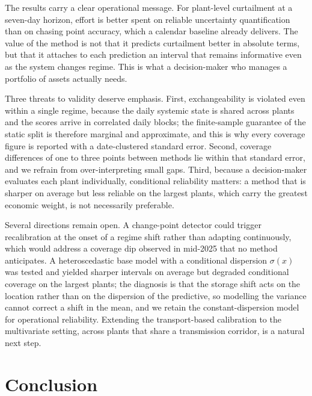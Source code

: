 \documentclass[preprint,3p,times]{elsarticle}
\begin{document}
The results carry a clear operational message. For plant-level curtailment at a seven-day horizon, effort is better spent on reliable uncertainty quantification than on chasing point accuracy, which a calendar baseline already delivers. The value of the method is not that it predicts curtailment better in absolute terms, but that it attaches to each prediction an interval that remains informative even as the system changes regime. This is what a decision-maker who manages a portfolio of assets actually needs.

Three threats to validity deserve emphasis. First, exchangeability is violated even within a single regime, because the daily systemic state is shared across plants and the scores arrive in correlated daily blocks; the finite-sample guarantee of the static split is therefore marginal and approximate, and this is why every coverage figure is reported with a date-clustered standard error. Second, coverage differences of one to three points between methods lie within that standard error, and we refrain from over-interpreting small gaps. Third, because a decision-maker evaluates each plant individually, conditional reliability matters: a method that is sharper on average but less reliable on the largest plants, which carry the greatest economic weight, is not necessarily preferable.

Several directions remain open. A change-point detector could trigger recalibration at the onset of a regime shift rather than adapting continuously, which would address a coverage dip observed in mid-2025 that no method anticipates. A heteroscedastic base model with a conditional dispersion $\sigma(x)$ was tested and yielded sharper intervals on average but degraded conditional coverage on the largest plants; the diagnosis is that the storage shift acts on the location rather than on the dispersion of the predictive, so modelling the variance cannot correct a shift in the mean, and we retain the constant-dispersion model for operational reliability. Extending the transport-based calibration to the multivariate setting, across plants that share a transmission corridor, is a natural next step.

\section{Conclusion}
\label{sec:conclusion}
\end{document}

